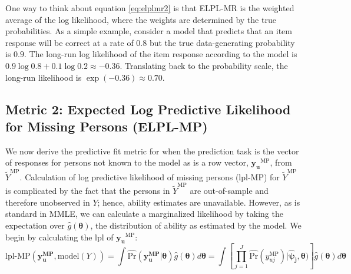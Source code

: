 \documentclass[
  english,
  man,floatsintext]{apa7}
\begin{document}
One way to think about equation \ref{eq:elplmr2} is that ELPL-MR is the weighted average of the log likelihood, where the weights are determined by the true probabilities. As a simple example, consider a model that predicts that an item response will be correct at a rate of \(0.8\) but the true data-generating probability is \(0.9\). The long-run log likelihood of the item response according to the model is \(0.9 \log 0.8 + 0.1 \log 0.2 \approx -0.36\). Translating back to the probability scale, the long-run likelihood is \(\exp(-0.36) \approx 0.70\).

\hypertarget{metric-2-expected-log-predictive-likelihood-for-missing-persons-elpl-mp}{%
\subsection{Metric 2: Expected Log Predictive Likelihood for Missing Persons (ELPL-MP)}\label{metric-2-expected-log-predictive-likelihood-for-missing-persons-elpl-mp}}

We now derive the predictive fit metric for when the prediction task is the vector of responses for persons not known to the model as is a row vector, \(\bm{y_u}^{\text{MP}}\), from \(\tilde Y^{\text{MP}}\). Calculation of log predictive likelihood of missing persons (lpl-MP) for \(\tilde Y^{\text{MP}}\) is complicated by the fact that the persons in \(\tilde Y^{\text{MP}}\) are out-of-sample and therefore unobserved in \(Y\); hence, ability estimates are unavailable. However, as is standard in MMLE, we can calculate a marginalized likelihood by taking the expectation over \(\hat g(\bm{\theta})\), the distribution of ability as estimated by the model. We begin by calculating the lpl of \(\bm{y_u}^{\text{MP}}\):
\begin{equation}
\text{lpl-MP}(\bm{y_u^\text{MP}}, \text{model}(Y)) = \int \hat{\text{Pr}}(\bm{y_u^\text{MP}}|\bm{\theta}) \hat g(\bm{\theta}) d\bm{\theta} = \int \left[\prod_{j=1}^{J} \hat{\text{Pr}}(y_{uj}^\text{MP}) | \bm{\hat\psi_j}, \bm{\theta}) \right] \hat g(\bm{\theta}) d\bm{\theta}
\end{equation}
\end{document}
